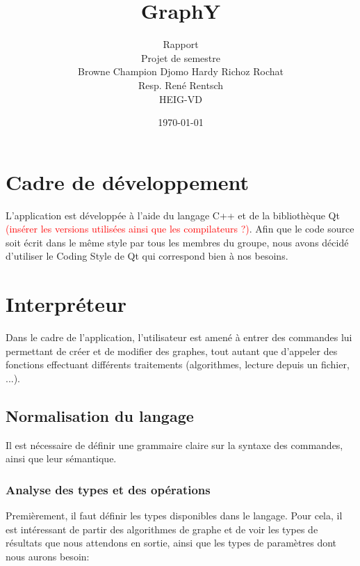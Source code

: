 \documentclass[french]{article}
\begin{document}
	
	
	\title{GraphY} %
	\author{Rapport\\ 
		Projet de semestre\\
		Browne Champion Djomo Hardy Richoz Rochat\\
		Resp. René Rentsch\\
		HEIG-VD}
	\date{\today} %
	\maketitle
	
	\tableofcontents
	
	\listoffigures
	
	\justify
	\normalsize
	
	\section{Cadre de développement} 
		L'application est développée à l'aide du langage C++ et de la bibliothèque Qt \textcolor{red}{(insérer les versions utilisées ainsi que les compilateurs ?)}. Afin que le code source soit écrit dans le même style par tous les membres du groupe, nous avons décidé d'utiliser le Coding Style de Qt \cite{qtStyle} qui correspond bien à nos besoins.
			
	\section{Interpréteur} %
		Dans le cadre de l'application, l'utilisateur est amené à entrer des commandes lui permettant de créer et de modifier des graphes, tout autant que d'appeler des fonctions effectuant différents traitements (algorithmes, lecture depuis un fichier, ...). 
	
		\subsection{Normalisation du langage} 
			Il est nécessaire de définir une grammaire claire sur la syntaxe des commandes, ainsi que leur sémantique.
			
			\subsubsection{Analyse des types et des opérations} 
				Premièrement, il faut définir les types disponibles dans le langage. Pour cela, il est intéressant de partir des algorithmes de graphe et de voir les types de résultats que nous attendons en sortie, ainsi que les types de paramètres dont nous aurons besoin:
			
\end{document}

